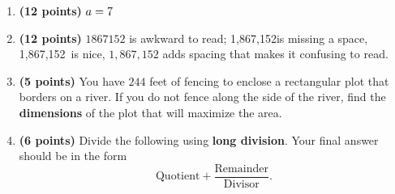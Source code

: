 \documentclass[12pt]{amsart}
\begin{document}
\begin{enumerate}
\item {\bf (12 points)} 
 $a = \a$ 
\vfill 
\def \a{7}\def \atwoone{1}\def \atwotwo{-2}\def \atwothree{1}\def \btwothree{6}\def \sumtwothree{7}\def \diftwothree{-5}\def \bigtwothree{100}\def \powtwothree{6}\def \logtwothree{0.0}\def \factortwothree{26}\def \atwofour{1.66}\def \btwofour{1.064}\def \tooshorttwofour{10.1}\def \moneytwofour{10.10}\def \longertwofour{10.10000}\def \atwofive{0.12}\def \btwofive{0.12346}\def \athreeone{6}\def \bthreeone{8}\def \setthreetwo{[12, 6, 9]}\def \athreetwo{12}\def \bthreetwo{6}\def \cthreetwo{9}\def \controlthreethree{-8}\def \athreethree{2}\def \topthreethree{0}\def \athreefour{5}\def \bthreefour{1}\def \listthreefour{[1, 2, 3, 4]}\def \afourone{4}\def \bfourone{-8}\def \fracfourone{\frac{-1}{2}}\def \rootfourtwo{12}\def \simplifiedfourtwo{2 \sqrt{3}}\def \sqrtlistfourtwo{[2, 3]}\def \outfourtwo{2}\def \infourtwo{3}\def \wowfourtwo{1}\def \afourthree{5}\def \nicethreefour{3x^{2}-x^{}+5}\def \nastythreefour{xyz^{3}+5}\def \cfourthree{4}\def \dfourthree{9}\def \infourthree{4x^{}}\def \outfourthree{+9y^{}}\def \afourfour{1867152}\def \nicefourfour{1,867,152}\def \goodfourfour{1,000,000.12345}\def \badfourfour{1,000,000.1}
\item {\bf (12 points)} 
 $\afourfour$ is awkward to read; \nicefourfour is missing a space, \nicefourfour\ is nice, $\nicefourfour$ adds spacing that makes it confusing to read. 
\vfill 
\newpage\def \x{61}\def \y{122}\def \L{244}\def \area{7442}
\item {\bf (5 points)} 
 You have $\L$ feet of fencing to enclose a rectangular plot that borders on a river. If you do not fence along the side of the river, find the \textbf{dimensions} of the plot that will maximize the area. \\

  
\vfill \vfill \vfill
\def \a{7}\def \b{3}\def \c{-3}\def \r{11}\def \monicpol{x^{}+7}\def \longnbad{3x^{2}+18x^{}-10}\def \anspol{3x^{}-3}
\item {\bf (6 points)} 
 Divide the following using {\bf long division}. Your final answer should be in the form $$ \text{Quotient} + \dfrac{\text{Remainder}}{\text{Divisor}}.$$


\end{enumerate}
\end{document}
